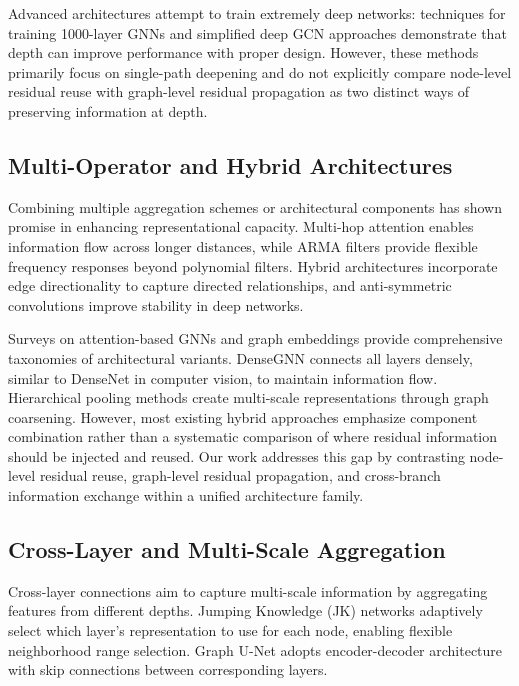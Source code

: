 Advanced architectures attempt to train extremely deep networks: techniques for training 1000-layer GNNs \cite{li2021training} and simplified deep GCN approaches \cite{oono2020simple} demonstrate that depth can improve performance with proper design. However, these methods primarily focus on single-path deepening and do not explicitly compare node-level residual reuse with graph-level residual propagation as two distinct ways of preserving information at depth.

\subsection{Multi-Operator and Hybrid Architectures}

Combining multiple aggregation schemes or architectural components has shown promise in enhancing representational capacity. Multi-hop attention \cite{wang2021multi} enables information flow across longer distances, while ARMA filters \cite{bianchi2020graph} provide flexible frequency responses beyond polynomial filters. Hybrid architectures incorporate edge directionality \cite{beaini2020directional, rossi2023edge} to capture directed relationships, and anti-symmetric convolutions \cite{gravina2022anti} improve stability in deep networks.

Surveys on attention-based GNNs \cite{sun2023attention} and graph embeddings \cite{cai2020understanding} provide comprehensive taxonomies of architectural variants. DenseGNN \cite{du2024densegnn} connects all layers densely, similar to DenseNet in computer vision, to maintain information flow. Hierarchical pooling methods \cite{pham2021hierarchical, ying2018hierarchical} create multi-scale representations through graph coarsening. However, most existing hybrid approaches emphasize component combination rather than a systematic comparison of where residual information should be injected and reused. Our work addresses this gap by contrasting node-level residual reuse, graph-level residual propagation, and cross-branch information exchange within a unified architecture family.

\subsection{Cross-Layer and Multi-Scale Aggregation}

Cross-layer connections aim to capture multi-scale information by aggregating features from different depths. Jumping Knowledge (JK) networks \cite{xu2018representation} adaptively select which layer's representation to use for each node, enabling flexible neighborhood range selection. Graph U-Net \cite{gao2019graph} adopts encoder-decoder architecture with skip connections between corresponding layers.

